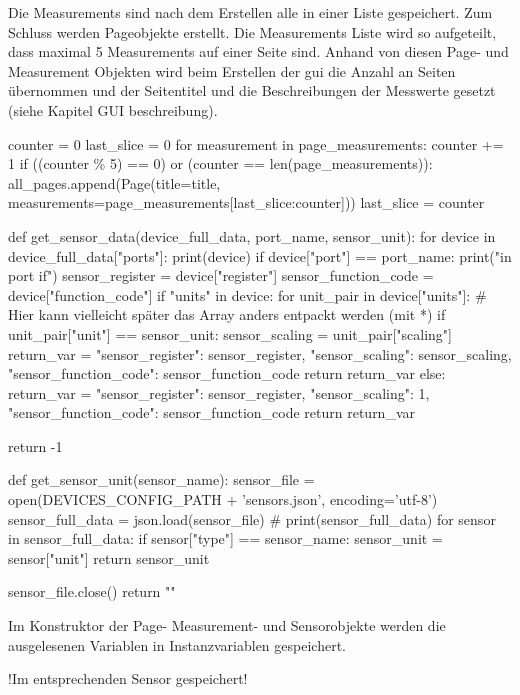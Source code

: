 Die Measurements sind nach dem Erstellen alle in einer Liste gespeichert. Zum Schluss werden Pageobjekte erstellt. Die Measurements Liste wird so aufgeteilt, dass maximal 5 Measurements auf einer Seite sind. Anhand von diesen Page- und Measurement Objekten wird beim Erstellen der \acs{gui} die Anzahl an Seiten übernommen und der Seitentitel und die Beschreibungen der Messwerte gesetzt (siehe Kapitel GUI beschreibung). 
\begin{pythoncode}
counter = 0
last_slice = 0
for measurement in page_measurements:
	counter += 1
	if ((counter \% 5) == 0) or (counter == len(page_measurements)):
		all_pages.append(Page(title=title, measurements=page_measurements[last_slice:counter]))
		last_slice = counter
\end{pythoncode}


\begin{pythoncode}
def get_sensor_data(device_full_data, port_name, sensor_unit):
	for device in device_full_data["ports"]:
	print(device)
	if device["port"] == port_name:
	print("in port if")
	sensor_register = device["register"]
	sensor_function_code = device["function_code"]
	if "units" in device:
	for unit_pair in device["units"]:  # Hier kann vielleicht später das Array anders entpackt werden (mit *)
	if unit_pair["unit"] == sensor_unit:
	sensor_scaling = unit_pair["scaling"]
	return_var = {"sensor_register": sensor_register, "sensor_scaling": sensor_scaling,
		"sensor_function_code": sensor_function_code}
	return return_var
	else:
	return_var = {"sensor_register": sensor_register, "sensor_scaling": 1,
		"sensor_function_code": sensor_function_code}
	return return_var
	
	
	return -1
	
	
def get_sensor_unit(sensor_name):
	sensor_file = open(DEVICES_CONFIG_PATH + 'sensors.json', encoding='utf-8')
	sensor_full_data = json.load(sensor_file)
	# print(sensor_full_data)
	for sensor in sensor_full_data:
	if sensor["type"] == sensor_name:
	sensor_unit = sensor["unit"]
	return sensor_unit
	
	sensor_file.close()
	return ""
\end{pythoncode}

Im Konstruktor der Page- Measurement- und Sensorobjekte werden die ausgelesenen Variablen in Instanzvariablen gespeichert.


!Im entsprechenden Sensor gespeichert!